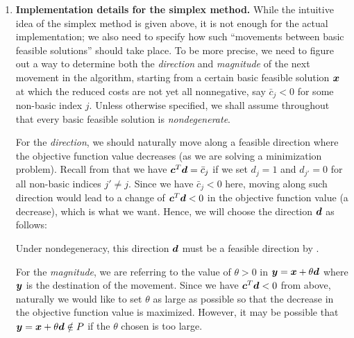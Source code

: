 \begin{enumerate}
\item\label{it:simplex-method-dir-mag} \textbf{Implementation details for the simplex method.}
While the intuitive idea of the simplex method is given above, it is not enough
for the actual implementation; we also need to specify how such ``movements
between basic feasible solutions'' should take place. To be more precise, we
need to figure out a way to determine both the \emph{direction} and
\emph{magnitude} of the next movement in the algorithm, starting from a certain
basic feasible solution \(\bm{x}\) at which the reduced costs are not yet all
nonnegative, say \(\bar{c}_{j}<0\) for some non-basic index \(j\). Unless
otherwise specified, we shall assume throughout that every basic feasible
solution is \emph{nondegenerate}.

For the \emph{direction}, we should naturally move along a feasible direction where the
objective function value decreases (as we are solving a minimization problem).
Recall from  that we have
\(\bm{c}^{T}\bm{d}=\bar{c}_j\) if we set \(d_j=1\) and \(d_{j'}=0\) for all
non-basic indices \(j'\ne j\). Since we have \(\bar{c}_j<0\) here, moving along such
direction would lead to a change of \(\bm{c}^{T}\bm{d}<0\) in the objective
function value (a decrease), which is what we want. Hence, we will choose the
direction \(\bm{d}\) as follows:
\begin{note}
Under nondegeneracy, this direction \(\bm{d}\) must be a feasible direction
by .
\end{note}

For the \emph{magnitude}, we are referring to the value of \(\theta>0\) in
\(\bm{y}=\bm{x}+\theta\bm{d}\) where \(\bm{y}\) is the destination of
the movement. Since we have \(\bm{c}^{T}\bm{d}<0\) from above, naturally we
would like to set \(\theta\) as large as possible so that the decrease in the
objective function value is maximized. However, it may be possible that
\(\bm{y}=\bm{x}+\theta\bm{d}\notin P\) if the \(\theta\) chosen is too
large.


\end{enumerate}

